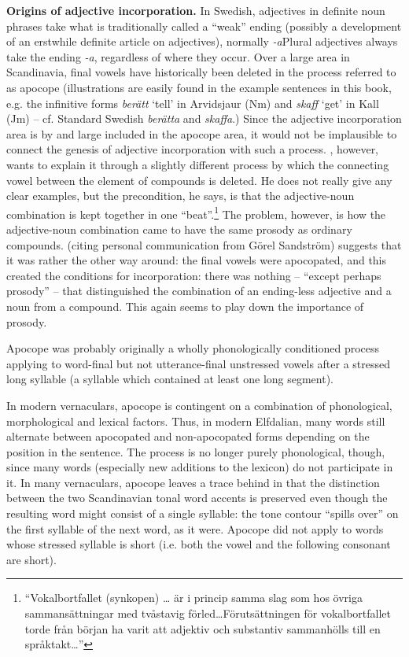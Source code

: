\textbf{Origins of adjective incorporation.} In Swedish, adjectives in definite noun phrases take what is traditionally called a “weak” ending (possibly a development of an erstwhile definite article on adjectives), normally\textit{ {}-a}Plural adjectives always take the ending\textit{ {}-a}, regardless of where they occur. Over a large area in Scandinavia, final vowels have historically been deleted in the process referred to as apocope (illustrations are easily found in the example sentences in this book, e.g. the infinitive forms \textit{berätt} ‘tell’ in Arvidsjaur (Nm) and \textit{skaff} ‘get’ in Kall (Jm) – cf. Standard Swedish \textit{berätta} and \textit{skaffa}.) Since the adjective incorporation area is by and large included in the apocope area, it would not be implausible to connect the genesis of adjective incorporation with such a process. \citet[102]{Dahlstedt1962}, however, wants to explain it through a slightly different process by which the connecting vowel between the element of compounds is deleted. He does not really give any clear examples, but the precondition, he says, is that the adjective-noun combination is kept together in one “beat”.\footnote{ “Vokalbortfallet (synkopen) … är i princip samma slag som hos övriga sammansättningar med tvåstavig förled…Förutsättningen för vokalbortfallet torde från början ha varit att adjektiv och substantiv sammanhölls till en språktakt…”} The problem, however, is how the adjective-noun combination came to have the same prosody as ordinary compounds. \citet[159]{Vangsnes2003} (citing personal communication from Görel Sandström) suggests that it was rather the other way around: the final vowels were apocopated, and this created the conditions for incorporation: there was nothing – “except perhaps prosody” – that distinguished the combination of an ending-less adjective and a noun from a compound. This again seems to play down the importance of prosody.

Apocope was probably originally a wholly phonologically conditioned process applying to word-final but not utterance-final unstressed vowels after a stressed long syllable (a syllable which contained at least one long segment).

In modern vernaculars, apocope is contingent on a combination of phonological, morphological and lexical factors. Thus, in modern Elfdalian, many words still alternate between apocopated and non-apocopated forms depending on the position in the sentence. The process is no longer purely phonological, though, since many words (especially new additions to the lexicon) do not participate in it. In many vernaculars, apocope leaves a trace behind in that the distinction between the two Scandinavian tonal word accents is preserved even though the resulting word might consist of a single syllable: the tone contour “spills over” on the first syllable of the next word, as it were. Apocope did not apply to words whose stressed syllable is short (i.e. both the vowel and the following consonant are short).

